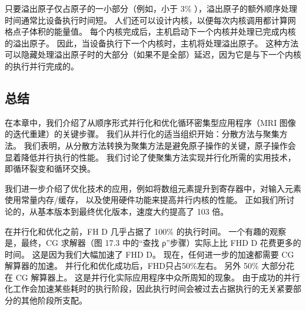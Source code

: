 只要溢出原子仅占原子的一小部分（例如，小于 $3 \%$ ），溢出原子的额外顺序处理时间通常比设备执行时间短。 
人们还可以设计内核，以便每次内核调用都计算网格点子体积的能量值。 
每个内核完成后，主机启动下一个内核并处理已完成内核的溢出原子。 
因此，当设备执行下一个内核时，主机将处理溢出原子。 
这种方法可以隐藏处理溢出原子时的大部分（如果不是全部）延迟，因为它是与下一个内核的执行并行完成的。

\subsection{总结}
在本章中，我们介绍了从顺序形式并行化和优化循环密集型应用程序（MRI 图像的迭代重建）的关键步骤。 
我们从并行化的适当组织开始：分散方法与聚集方法。 
我们表明，从分散方法转换为聚集方法是避免原子操作的关键，原子操作会显着降低并行执行的性能。 
我们讨论了使聚集方法实现并行化所需的实用技术，即循环裂变和循环交换。

我们进一步介绍了优化技术的应用，例如将数组元素提升到寄存器中，对输入元素使用常量内存/缓存，
以及使用硬件功能来提高并行内核的性能。 正如我们所讨论的，从基本版本到最终优化版本，速度大约提高了 103 倍。

在并行化和优化之前，FH D 几乎占据了 100\% 的执行时间。 
一个有趣的观察是，最终，CG 求解器（图 17.3 中的“查找 ρ”步骤）实际上比 FHD D 花费更多的时间。
这是因为我们大幅加速了 FHD D。 现在，任何进一步的加速都需要 CG 解算器的加速。 
并行化和优化成功后，FHD只占50\%左右。 另外 50\% 大部分花在 CG 解算器上。 这是并行化实际应用程序中众所周知的现象。 
由于成功的并行化工作会加速某些耗时的执行阶段，因此执行时间会被过去占据执行的无关紧要部分的其他阶段所支配。